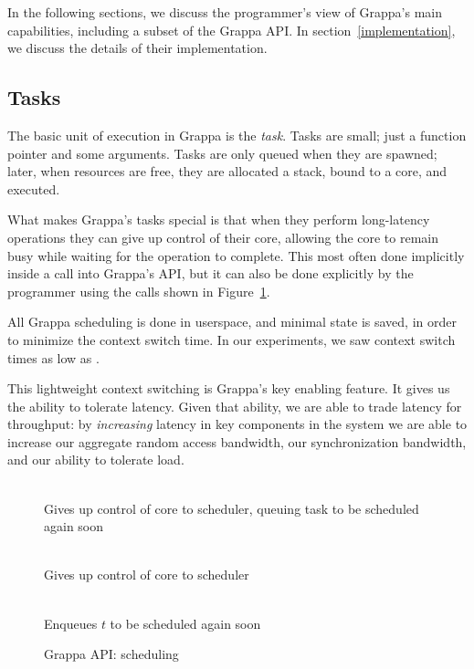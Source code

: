 In the following sections, we discuss the programmer's view of
Grappa's main capabilities, including a subset of the Grappa API. In
section~\ref{implementation}, we discuss the details of their
implementation.


\subsection{Tasks}


The basic unit of execution in Grappa is the {\em task}. Tasks are
small; just a function pointer and some arguments. Tasks are only
queued when they are spawned; later, when resources are free, they are
allocated a stack, bound to a core, and executed.

What makes Grappa's tasks special is that when they perform
long-latency operations they can give up control of their core,
allowing the core to remain busy while waiting for the operation to
complete. This most often done implicitly inside a call into Grappa's
API, but it can also be done explicitly by the programmer using the
calls shown in Figure~\ref{fig:scheduling}.

All Grappa scheduling is done in userspace, and minimal state is
saved, in order to minimize the context switch time. In our
experiments, we saw context switch times as low as .

This lightweight context switching is Grappa's key enabling
feature. It gives us the ability to tolerate latency. Given that
ability, we are able to trade latency for throughput: by {\em
  increasing} latency in key components in the system we are able to
increase our aggregate random access bandwidth, our synchronization
bandwidth, and our ability to tolerate load.

\begin{figure}[htbp]
  \begin{center}
    \begin{description}\small
    \item[ \texttt{ yield() } ] \hfill \\
      Gives up control of core to scheduler, queuing task to be scheduled again soon
    \item[ \texttt{ suspend() } ] \hfill \\
      Gives up control of core to scheduler
    \item[ \texttt{ wake( task * $t$ ) } ] \hfill \\
      Enqueues $t$ to be scheduled again soon
    \end{description}
    \begin{minipage}{0.95\columnwidth}
      \caption{\label{fig:scheduling} Grappa API: scheduling} %
    \end{minipage}
  \end{center}
\end{figure}


